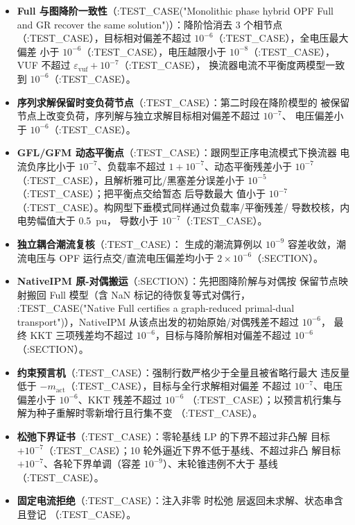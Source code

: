 \begin{itemize}
  \item \textbf{Full 与图降阶一致性}（:TEST\_CASE("Monolithic phase hybrid OPF Full and GR recover the same solution")）：降阶恰消去 3 个相节点
        （:TEST\_CASE），目标相对偏差不超过 $10^{-6}$（:TEST\_CASE），全电压最大偏差
        小于 $10^{-6}$（:TEST\_CASE），电压越限小于 $10^{-8}$（:TEST\_CASE），
        VUF 不超过 $\varepsilon_{\mathrm{vuf}}+10^{-7}$（:TEST\_CASE），
        换流器电流不平衡度两模型一致到 $10^{-6}$（:TEST\_CASE）。
  \item \textbf{序列求解保留时变负荷节点}（:TEST\_CASE）：第二时段在降阶模型的
        被保留节点上改变负荷，序列解与独立求解目标相对偏差不超过 $10^{-7}$、
        电压偏差小于 $10^{-6}$（:TEST\_CASE）。
  \item \textbf{GFL/GFM 动态平衡点}（:TEST\_CASE）：跟网型正序电流模式下换流器
        电流负序比小于 $10^{-7}$、负载率不超过 $1+10^{-7}$、动态平衡残差小于
        $10^{-7}$（:TEST\_CASE），且解析雅可比/黑塞差分误差小于 $10^{-5}$
        （:TEST\_CASE）；把平衡点交给暂态  后导数最大
        值小于 $10^{-7}$（:TEST\_CASE）。构网型下垂模式同样通过负载率/平衡残差/
        导数校核，内电势幅值大于 0.5~pu， 导数小于
        $10^{-7}$（:TEST\_CASE）。
  \item \textbf{独立耦合潮流复核}（:TEST\_CASE）：
         生成的潮流算例以
        $10^{-9}$ 容差收敛，潮流电压与 OPF 运行点交/直流电压偏差均小于
        $2\times10^{-6}$（:SECTION）。
  \item \textbf{NativeIPM 原-对偶搬运}（:SECTION）：先把图降阶解与对偶按
        保留节点映射搬回 Full 模型（含 NaN 标记的待恢复等式对偶行，
        :TEST\_CASE("Native Full certifies a graph-reduced primal-dual transport")），NativeIPM 从该点出发的初始原始/对偶残差不超过 $10^{-6}$，
        最终 KKT 三项残差均不超过 $10^{-6}$，目标与降阶解相对偏差不超过
        $10^{-6}$（:SECTION）。
  \item \textbf{约束预言机}（:TEST\_CASE）：强制行数严格少于全量且被省略行最大
        违反量低于 $-m_{\mathrm{act}}$（:TEST\_CASE），目标与全行求解相对偏差
        不超过 $10^{-7}$、电压偏差小于 $10^{-6}$、KKT 残差不超过 $10^{-6}$
        （:TEST\_CASE）；以预言机行集与解为种子重解时零新增行且行集不变
        （:TEST\_CASE）。
  \item \textbf{松弛下界证书}（:TEST\_CASE）：零轮基线 LP 的下界不超过非凸解
        目标 $+10^{-7}$（:TEST\_CASE）；10 轮外逼近下界不低于基线、不超过非凸
        解目标 $+10^{-7}$、各轮下界单调（容差 $10^{-9}$）、末轮锥违例不大于
        基线（:TEST\_CASE）。
  \item \textbf{固定电流拒绝}（:TEST\_CASE）：注入非零  时松弛
        层返回未求解、状态串含  且登记
        （:TEST\_CASE）。
\end{itemize}

